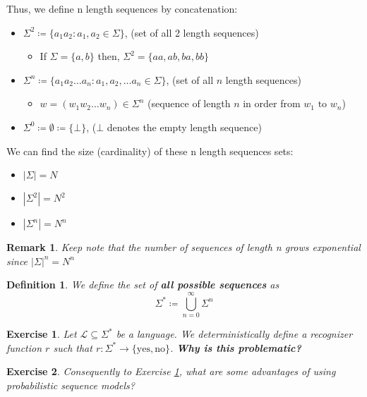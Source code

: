 \documentclass[12pt, twoside]{article}
\theoremstyle{spaceddefn}
\newtheorem{definition}{Definition}[section]
\newtheorem{remark}{Remark}[section]
\newtheorem{exercise}{Exercise}[section]
\begin{document}
Thus, we define n length sequences by concatenation:
\begin{itemize}
    \item $\Sigma^2 \coloneqq \{a_1a_2:a_1,a_2 \in \Sigma\}$, (set of all 2 length sequences)
    \begin{itemize}[label=$\circ$]
        \item If $\Sigma=\{a,b\}$ then, $\Sigma^2=\{aa,ab,ba,bb\}$
    \end{itemize}
    \item $\Sigma^n\coloneqq \{a_1a_2\dots a_n:a_1,a_2,\dots a_n \in \Sigma\} $, (set of all $n$ length sequences)
    \begin{itemize}
        \item $w = (w_1w_2\dots w_n)\in\Sigma^n$ (sequence of length $n$ in order from $w_1 \text{ to } w_n$)
    \end{itemize}
    \item $\Sigma^0 \coloneqq \emptyset \coloneqq \{\bot\}$, ($\bot$ denotes the empty length sequence)
\end{itemize}

We can find the size (cardinality) of these n length sequences sets:
\begin{itemize}
    \item $|\Sigma| = N$
    \item $|\Sigma^2| = N^2$
    \item $|\Sigma^n| = N^n$
\end{itemize}

\begin{remark}
    Keep note that the number of sequences of length n grows exponential since $|\Sigma|^n=N^n$
\end{remark}

\begin{definition}
    We define the set of \textbf{all possible sequences} as
    \[\Sigma^* \coloneqq \bigcup_{n=0}^{\infty} \Sigma^n \]
\end{definition}

\begin{exercise} \label{ex:1.1}
     Let $\mathcal{L} \subseteq \Sigma^*$ be a language. We deterministically define a recognizer function $r$ such that  $r: \Sigma^* \to \{ \text{yes}, \text{no} \}$. \textbf{Why is this problematic?}
\end{exercise}

\begin{exercise} \label{ex:1.2}
    Consequently to Exercise \ref{ex:1.1}, what are some advantages of using probabilistic sequence models?
\end{exercise}
\end{document}
